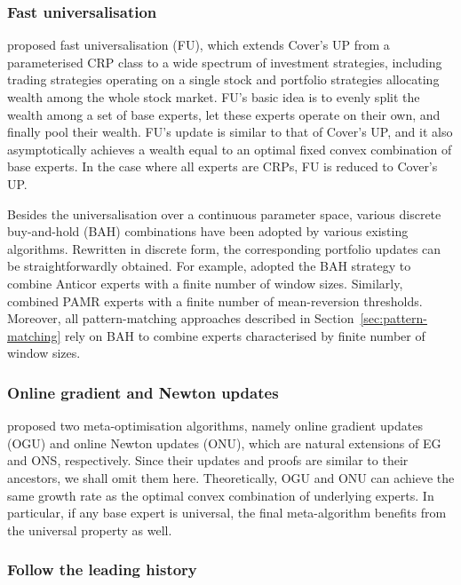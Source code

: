 \subsubsection{Fast universalisation}

\citet{akcoglu02, akcoglu04} proposed fast universalisation (FU), which extends Cover's UP \citep{cover} from a parameterised CRP class to a wide spectrum of investment strategies, including trading strategies operating on a single stock and portfolio strategies allocating wealth among the whole stock market. FU's basic idea is to evenly split the wealth among a set of base experts, let these experts operate on their own, and finally pool their wealth. FU's update is similar to that of Cover's UP, and it also asymptotically achieves a wealth equal to an optimal fixed convex combination of base experts. In the case where all experts are CRPs, FU is reduced to Cover's UP.

Besides the universalisation over a continuous parameter space, various discrete buy-and-hold (BAH) combinations have been adopted by various existing algorithms. Rewritten in discrete form, the corresponding portfolio updates can be straightforwardly obtained. For example, \citet{borodin04} adopted the BAH strategy to combine Anticor experts with a finite number of window sizes. Similarly, \citet{pamr} combined PAMR experts with a finite number of mean-reversion thresholds. Moreover, all pattern-matching approaches described in Section~\ref{sec:pattern-matching} rely on BAH to combine experts characterised by finite number of window sizes.

\subsubsection{Online gradient and Newton updates}
\label{sec:ogu}

\citet{das11} proposed two meta-optimisation algorithms, namely online gradient updates (OGU) and online Newton updates (ONU), which are natural extensions of EG and ONS, respectively. Since their updates and proofs are similar to their ancestors, we shall omit them here. Theoretically, OGU and ONU can achieve the same growth rate as the optimal convex combination of underlying experts. In particular, if any base expert is universal, the final meta-algorithm benefits from the universal property as well.

\subsubsection{Follow the leading history}


